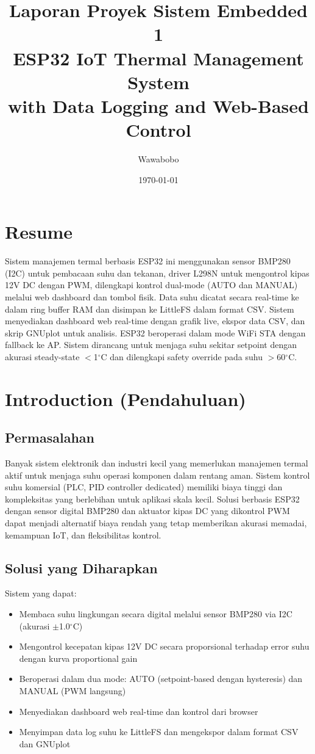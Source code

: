 \documentclass[11pt,a4paper]{article}
\title{Laporan Proyek Sistem Embedded 1\\
ESP32 IoT Thermal Management System\\
\large with Data Logging and Web-Based Control}
\author{Wawabobo}
\date{\today}
\begin{document}
\maketitle

\thispagestyle{empty}

\newpage

\section{Resume}

Sistem manajemen termal berbasis ESP32 ini menggunakan sensor BMP280 (I2C) untuk pembacaan suhu dan tekanan, driver L298N untuk mengontrol kipas 12V DC dengan PWM, dilengkapi kontrol dual-mode (AUTO dan MANUAL) melalui web dashboard dan tombol fisik. Data suhu dicatat secara real-time ke dalam ring buffer RAM dan disimpan ke LittleFS dalam format CSV. Sistem menyediakan dashboard web real-time dengan grafik live, ekspor data CSV, dan skrip GNUplot untuk analisis. ESP32 beroperasi dalam mode WiFi STA dengan fallback ke AP. Sistem dirancang untuk menjaga suhu sekitar setpoint dengan akurasi steady-state $<$1$^{\circ}$C dan dilengkapi safety override pada suhu $>$60$^{\circ}$C.

\section{Introduction (Pendahuluan)}

\subsection{Permasalahan}

Banyak sistem elektronik dan industri kecil yang memerlukan manajemen termal aktif untuk menjaga suhu operasi komponen dalam rentang aman. Sistem kontrol suhu komersial (PLC, PID controller dedicated) memiliki biaya tinggi dan kompleksitas yang berlebihan untuk aplikasi skala kecil. Solusi berbasis ESP32 dengan sensor digital BMP280 dan aktuator kipas DC yang dikontrol PWM dapat menjadi alternatif biaya rendah yang tetap memberikan akurasi memadai, kemampuan IoT, dan fleksibilitas kontrol.

\subsection{Solusi yang Diharapkan}

Sistem yang dapat:
\begin{itemize}
    \item Membaca suhu lingkungan secara digital melalui sensor BMP280 via I2C (akurasi $\pm$1.0$^{\circ}$C)
    \item Mengontrol kecepatan kipas 12V DC secara proporsional terhadap error suhu dengan kurva proportional gain
    \item Beroperasi dalam dua mode: AUTO (setpoint-based dengan hysteresis) dan MANUAL (PWM langsung)
    \item Menyediakan dashboard web real-time dan kontrol dari browser
    \item Menyimpan data log suhu ke LittleFS dan mengekspor dalam format CSV dan GNUplot
\end{itemize}
\end{document}
